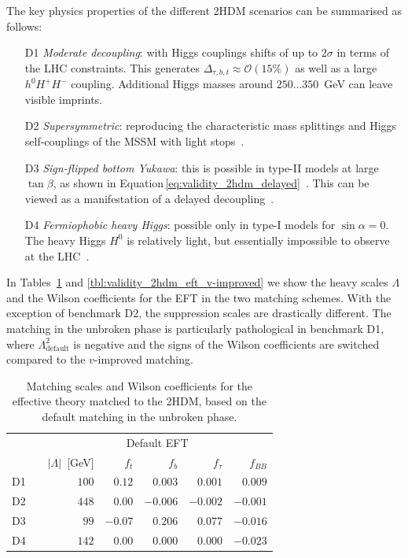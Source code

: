 The key physics properties of the different 2HDM scenarios can be
summarised as follows:
%
\begin{enumerate}
\item[D1] \emph{Moderate decoupling}: with Higgs couplings shifts of
  up to $2\sigma$ in terms of the LHC constraints.  This generates
  $\Delta_{\tau,b,t} \approx \mathcal{O}(15\%)$ as well as a large
  $h^0 H^+ H^-$ coupling. Additional Higgs masses around
  $250\dots350$~GeV can leave visible imprints.
%
\item[D2] \emph{Supersymmetric}: reproducing the characteristic mass
  splittings and Higgs self-couplings of the MSSM with light
  stops~\cite{Carena:2013ytb}.
%
\item[D3] \emph{Sign-flipped bottom Yukawa}: this is possible in
  type-II models at large $\tan\beta$, as shown in
  Equation\,\eqref{eq:validity_2hdm_delayed}~\cite{Ferreira:2014naa}. This
  can be viewed as a manifestation of a delayed
  decoupling~\cite{Haber:2000kq}.
%
\item[D4] \emph{Fermiophobic heavy Higgs}: possible only in type-I
  models for $\sin\alpha =0$. The heavy Higgs $H^0$ is relatively
  light, but essentially impossible to observe at the
  LHC~\cite{Hespel:2014sla}.
\end{enumerate}

In Tables~\ref{tbl:validity_2hdm_eft_default} and
\ref{tbl:validity_2hdm_eft_v-improved} we show the heavy scales
$\Lambda$ and the Wilson coefficients for the EFT in the two matching
schemes. With the exception of benchmark D2, the suppression scales
are drastically different. The matching in the unbroken phase is
particularly pathological in benchmark D1, where
$\Lambda_{\text{default}}^2$ is negative and the signs of the Wilson
coefficients are switched compared to the $v$-improved matching.

\begin{table}
  \begin{tabular}{c c rrrrr }
    \toprule
    \multirow{2}{*}{}
    && \multicolumn{5}{c}{Default EFT} \\
    \cmidrule{3-7} 
    && $|\Lambda|$~[GeV] & $f_t$ & $f_{b}$  & $f_{\tau}$ & $f_{BB}$ \\
    \midrule
    D1 && $100$ & $0.12$ & $0.003$ & $0.001$ & $0.009$ \\
    D2 && $448$ & $0.00$ & $-0.006$ & $-0.002$  & $-0.001$ \\
    D3 && $99$ & $-0.07$ & $0.206$ & $0.077$ &  $-0.016$\\
    D4 && $142$ & $0.00$ & $0.000$ & $0.000$ &  $-0.023$\\
    \bottomrule
  \end{tabular}
  \caption[Default EFT description for the 2HDM benchmarks]{Matching scales and Wilson coefficients for the effective
    theory matched to the 2HDM, based on the default matching in the unbroken phase.}
 \label{tbl:validity_2hdm_eft_default}
\end{table}

